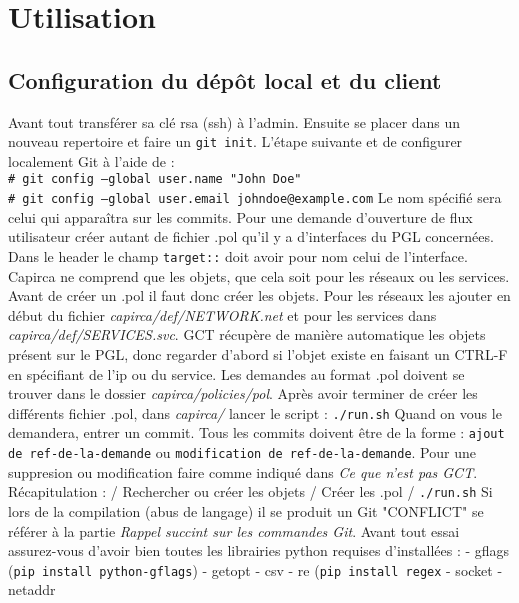 \documentclass{article}
\newcommand{\shellcmdd}[1]{\\\indent\indent\texttt{\footnotesize\# #1}}
\begin{document}
  \section{Utilisation}
    \subsection{Configuration du dépôt local et du client}

      Avant tout transférer sa clé rsa (ssh) à l'admin. Ensuite se placer dans un nouveau repertoire et faire un \texttt{git init}.
      L'étape suivante et de configurer localement Git à l'aide de : \shellcmdd{git config --global user.name "John Doe"}
      \shellcmdd{git config --global user.email johndoe@example.com}\smallbreak
      \noindent Le nom spécifié sera celui qui apparaîtra sur les commits.
      Pour une demande d'ouverture de flux utilisateur créer autant de fichier .pol qu'il y a d'interfaces du PGL concernées.
      Dans le header le champ \texttt{target::} doit avoir pour nom celui de l'interface.
      Capirca ne comprend que les objets, que cela soit pour les réseaux ou les services.
      Avant de créer un .pol il faut donc créer les objets. Pour les réseaux les ajouter en début du fichier \textit{capirca/def/NETWORK.net}
      et pour les services dans \textit{capirca/def/SERVICES.svc}. GCT récupère de manière automatique les objets présent
      sur le PGL, donc regarder d'abord si l'objet existe en faisant un CTRL-F en spécifiant de l'ip ou du service.
      Les demandes au format .pol doivent se trouver dans le dossier \textit{capirca/policies/pol}.
      Après avoir terminer de créer les différents fichier .pol, dans \textit{capirca/} lancer le script  : \texttt{./run.sh} \smallbreak
      \noindent Quand on vous le demandera, entrer un commit. Tous les commits doivent être de la forme : \texttt{ajout de ref-de-la-demande} ou
      \texttt{modification de ref-de-la-demande}. Pour une suppresion ou modification faire comme indiqué dans \textit{Ce que n'est pas GCT}.
      \bigbreak Récapitulation : / Rechercher ou créer les objets / Créer les .pol / \texttt{./run.sh} \bigbreak
      \noindent Si lors de la compilation (abus de langage) il se produit un Git "CONFLICT" se référer à la partie \textit{Rappel succint
      sur les commandes Git}.
      Avant tout essai assurez-vous d'avoir bien toutes les librairies python requises d'installées : \smallbreak
      - gflags (\texttt{pip install python-gflags}) \smallbreak
      - getopt \smallbreak
      - csv \smallbreak
      - re (\texttt{pip install regex}\smallbreak
      - socket \smallbreak
      - netaddr
\end{document}
